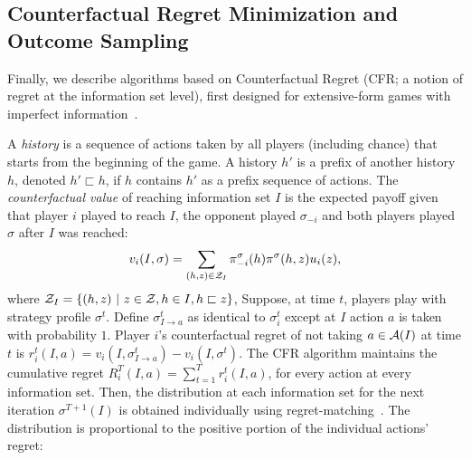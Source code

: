 \subsection{Counterfactual Regret Minimization and Outcome Sampling} \label{sec:algs:cfros}

Finally, we describe algorithms based on Counterfactual Regret (CFR; a notion of regret at the information set level),
first designed for extensive-form games with imperfect information~\cite{CFR}.

A {\it history} is a sequence of actions taken by all players (including chance) that starts from the beginning of the game.
A history $h'$ is a prefix of another history $h$, denoted $h' \sqsubset h$, if $h$ contains $h'$ as a prefix sequence of actions.
The {\it counterfactual value} of reaching information set $I$ is the expected payoff given that player $i$ played to reach $I$, the opponent played
$\sigma_{-i}$ and both players played $\sigma$ after $I$ was reached:
\begin{equation}
\label{eq:cfv}
v_i(I,\sigma) = \sum_{(h,z) \in \mathcal{Z}_I} \pi^{\sigma}_{-i}(h) \pi^{\sigma}(h,z) u_i(z),
\end{equation}
where $\mathcal{Z}_I = \{ (h,z)~|~z \in \mathcal{Z}, h \in I, h \sqsubset z \}$, 
Suppose, at time $t$, players play with strategy profile $\sigma^t$.
Define $\sigma^t_{I \rightarrow a}$ as identical to $\sigma^t_i$ except at $I$ action $a$ is taken with probability $1$.
Player $i$'s counterfactual regret of not taking $a \in \mathcal{A}(I)$ at time $t$ is $r_i^t(I,a) = v_i(I, \sigma^t_{I \rightarrow a}) - v_i(I,\sigma^t)$.
The CFR algorithm maintains the cumulative regret $R_i^T(I,a) = \sum_{t=1}^T r_i^t(I,a)$, for every action at every information set.
Then, the distribution at each information set for the next iteration $\sigma^{T+1}(I)$ is obtained individually using
regret-matching~\cite{Hart00}. The distribution is proportional to the positive portion of the individual actions' regret:

